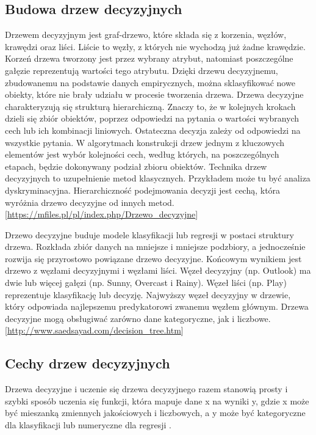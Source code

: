 \documentclass[10pt,a4paper]{article}
\begin{document}
\subsection{Budowa drzew decyzyjnych}
Drzewem decyzyjnym jest graf-drzewo, które składa się z korzenia, węzłów, krawędzi oraz liści. Liście to węzły, z których nie wychodzą już żadne krawędzie. Korzeń drzewa tworzony jest przez wybrany atrybut, natomiast poszczególne gałęzie reprezentują wartości tego atrybutu. Dzięki drzewu decyzyjnemu, zbudowanemu na podstawie danych empirycznych, można sklasyfikować nowe obiekty, które nie brały udziału w procesie tworzenia drzewa. Drzewa decyzyjne charakteryzują się strukturą hierarchiczną. Znaczy to, że w kolejnych krokach dzieli się zbiór obiektów, poprzez odpowiedzi na pytania o wartości wybranych cech lub ich kombinacji liniowych. Ostateczna decyzja zależy od odpowiedzi na wszystkie pytania. W algorytmach konstrukcji drzew jednym z kluczowych elementów jest wybór kolejności cech, według których, na poszczególnych etapach, będzie dokonywany podział zbioru obiektów. Technika drzew decyzyjnych to uzupełnienie metod klasycznych. Przykładem może tu być analiza dyskryminacyjna. Hierarchiczność podejmowania decyzji jest cechą, która wyróżnia drzewo decyzyjne od innych metod.
[\url{https://mfiles.pl/pl/index.php/Drzewo_decyzyjne}]

Drzewo decyzyjne buduje modele klasyfikacji lub regresji w postaci struktury drzewa. Rozkłada zbiór danych na mniejsze i mniejsze podzbiory, a jednocześnie rozwija się przyrostowo powiązane drzewo decyzyjne. Końcowym wynikiem jest drzewo z węzłami decyzyjnymi i węzłami liści. Węzeł decyzyjny (np. Outlook) ma dwie lub więcej gałęzi (np. Sunny, Overcast i Rainy). Węzeł liści (np. Play) reprezentuje klasyfikację lub decyzję. Najwyższy węzeł decyzyjny w drzewie, który odpowiada najlepszemu predykatorowi zwanemu węzłem głównym. Drzewa decyzyjne mogą obsługiwać zarówno dane kategoryczne, jak i liczbowe. 
[\url{http://www.saedsayad.com/decision_tree.htm}]


\subsection{Cechy drzew decyzyjnych}
Drzewa decyzyjne i uczenie się drzewa decyzyjnego razem stanowią prosty i szybki sposób uczenia się funkcji, która mapuje dane x na wyniki y, gdzie x może być mieszanką zmiennych jakościowych i liczbowych, a y może być kategoryczne dla klasyfikacji lub numeryczne dla regresji \cite{Breiman1984, Lan2017}.
\end{document}
